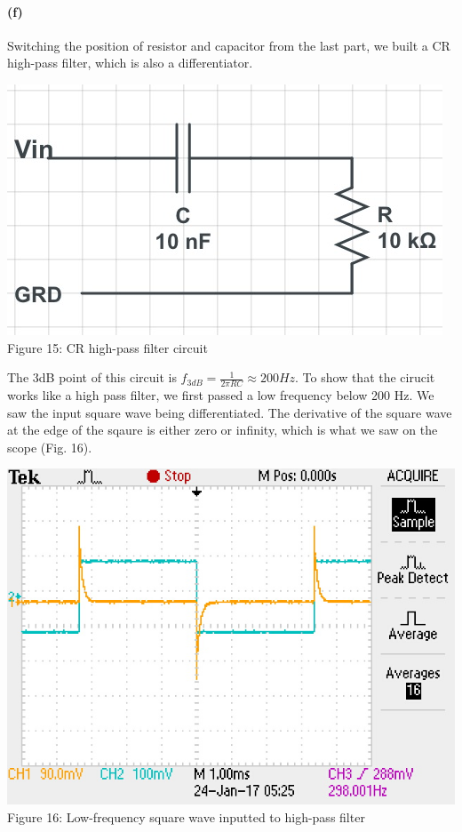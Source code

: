 \documentclass[]{article}
\begin{document}
	\paragraph{ (f)}
	Switching the position of resistor and capacitor from the last part, we built a CR high-pass filter, which is also a differentiator. 
		\begin{center}
			\includegraphics[scale=0.4]{f_circuit}\\
			Figure 15: CR high-pass filter circuit
		\end{center}
The 3dB point of this circuit is $f_{3dB}=\frac{1}{2\pi RC} \approx 200Hz$. To show that the cirucit works like a high pass filter, we first passed a low frequency below 200 Hz. We saw the input square wave being differentiated. The derivative of the square wave at the edge of the sqaure is either zero or infinity, which is what we saw on the scope (Fig. 16).
	\begin{center}
		\includegraphics[scale=0.7]{f_hipass}\\
		Figure 16: Low-frequency square wave inputted to high-pass filter
	\end{center}
\end{document}
